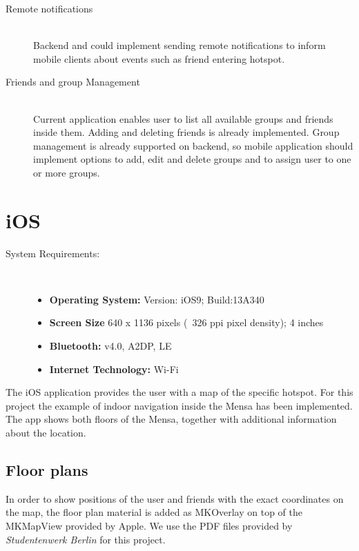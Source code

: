 \begin{description}
  \item[Remote notifications] \hfill \\
  Backend and could implement sending remote notifications to inform mobile clients about events such as friend entering hotspot.
  \item[Friends and group Management] \hfill \\
  Current application enables user to list all available groups and friends inside them. Adding and deleting friends is already implemented. Group management is already supported on backend, so mobile application should implement options to add, edit and delete groups and to assign user to one or more groups.
  
\end{description}
\pagebreak


\section{iOS}

\begin{description}
\item[System Requirements:] \hfill \\
\begin{itemize}
  \item \textbf{Operating System:} Version: iOS9; Build:13A340
  \item \textbf{Screen Size} 640 x 1136 pixels (~326 ppi pixel density); 4 inches
  \item \textbf{Bluetooth:} v4.0, A2DP, LE
  \item \textbf{Internet Technology:} Wi-Fi
\end{itemize}
\end{description}

The iOS application provides the user with a map of the specific hotspot. For this project the example of indoor navigation inside the Mensa has been implemented. The app shows both floors of the Mensa, together with additional information about the location.

\subsection{Floor plans}
In order to show positions of the user and friends with the exact coordinates on the map, the floor plan material is added as MKOverlay on top of the MKMapView provided by Apple. We use the PDF files provided by \textit{Studentenwerk Berlin} for this project.

